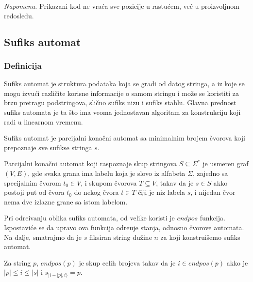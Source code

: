 \noindent
\begin{minipage}[l]{\textwidth}

\end{minipage}

\textit{Napomena.} Prikazani kod ne vra\' ca sve pozicije u rastu\' cem, ve\' c u proizvoljnom redosledu.

\subsection{Sufiks automat}

\subsubsection{Definicija}

Sufiks automat je struktura podataka koja se gradi od datog stringa, a iz koje se mogu izvu\' ci razli\v cite korisne informacije o samom stringu i mo\v ze se koristiti za brzu pretragu podstringova, sli\v cno sufiks nizu i sufiks stablu. Glavna prednost sufiks automata je ta \v sto ima veoma jednostavan algoritam za konstrukciju koji radi u linearnom vremenu.

\begin{dfn}
Sufiks automat je parcijalni kona\v cni automat sa minimalnim brojem \v cvorova koji prepoznaje sve sufikse stringa $s$.
\end{dfn}

Parcijalni kona\v cni automat koji raspoznaje skup stringova $S \subseteq \Sigma^*$ je usmeren graf $(V,E)$, gde svaka grana ima labelu koja je slovo iz alfabeta $\Sigma$, zajedno sa specijalnim \v cvorom $t_0 \in V$, i skupom \v cvorova $T \subseteq V$, takav da je $s \in S$ akko postoji put od \v cvora $t_0$ do nekog \v cvora $t \in T$ \v ciji je niz labela $s$, i nijedan \v cvor nema dve izlazne grane sa istom labelom.

Pri odre\dj ivanju oblika sufiks automata, od velike koristi je $endpos$ funkcija. Ispostavi\' ce se da upravo ova funkcija odre\dj uje stanja, odnosno \v cvorove automata. Na dalje, smatrajmo da je $s$ fiksiran string du\v zine $n$ za koji konstrui\v semo sufiks automat.

\begin{dfn}
Za string $p$, $endpos(p)$ je skup celih brojeva takav da je $i \in endpos(p)$ akko je $|p| \leq i \leq |s|$ i $s_{[i-|p|,i)} = p$.
\end{dfn}

